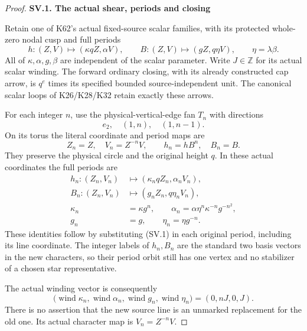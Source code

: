 \begin{proof}
\par

\medskip\noindent\textbf{SV.1. The actual shear, periods and closing}

\par\nobreak

Retain one of K62's actual fixed-source scalar families,
with its protected whole-zero nodal cusp and full periods
\[
 h:(Z,V)\mapsto(\kappa qZ,\alpha V),\qquad
 B:(Z,V)\mapsto(gZ,q\eta V),\qquad \eta=\lambda\beta.
\]
All of \(\kappa,\alpha,g,\beta\) are independent of the
scalar parameter. Write \(J\in\mathbb Z\) for its actual
scalar winding. The forward ordinary closing, with its
already constructed cap arrow, is \(q^e\) times its
specified bounded source-independent unit. The canonical
scalar loops of K26/K28/K32 retain exactly these arrows.

For each integer \(n\), use the physical-vertical-edge
fan \(T_n\) with directions
\[
             e_2,\quad (1,n),\quad(1,n-1).
\]
On its torus the literal coordinate and period maps are
\[
 Z_n=Z,\quad V_n=Z^{-n}V,\qquad h_n=hB^n,\quad B_n=B.
                                                        \tag{SV.1}
\]
They preserve the physical circle and the original height
\(q\). In these actual coordinates the full periods are
\[
 \begin{aligned}
 h_n:(Z_n,V_n)&\mapsto(\kappa_n qZ_n,\alpha_n V_n),\\
 B_n:(Z_n,V_n)&\mapsto(g_nZ_n,q\eta_nV_n),\\
 \kappa_n&=\kappa g^n,\qquad
 \alpha_n=\alpha\eta^n\kappa^{-n}g^{-n^2},\\
 g_n&=g,\qquad \eta_n=\eta g^{-n}.
 \end{aligned}                                          \tag{SV.2}
\]
These identities follow by substituting (SV.1) in each
original period, including its line coordinate. The
integer labels of \(h_n,B_n\) are the standard two basis
vectors in the new characters, so their period orbit
still has one vertex and no stabilizer of a chosen
star representative.

The actual winding vector is consequently
\[
 \bigl(\operatorname{wind}\kappa_n,
       \operatorname{wind}\alpha_n,
       \operatorname{wind}g_n,
       \operatorname{wind}\eta_n\bigr)
                    =(0,nJ,0,J).                    \tag{SV.3}
\]
There is no assertion that the new source line is an
unmarked replacement for the old one. Its actual
character map is \(V_n=Z^{-n}V\).


\end{proof}
